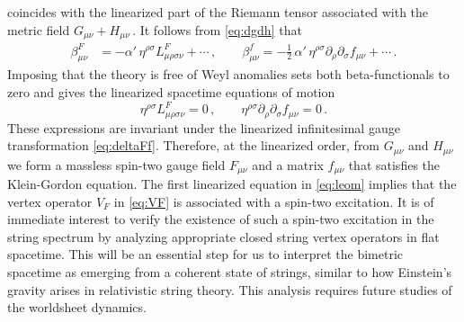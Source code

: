 \documentclass[11pt]{article}
\newcommand{\be}{\begin{equation}}
\newcommand{\ee}{\end{equation}}
\newcommand{\p}{\partial}
\begin{document}
%
coincides with the linearized part of the Riemann tensor associated with the metric field $G_{\mu\nu} + H_{\mu\nu}$\,.
It follows from \eqref{eq:dgdh} that
%
\begin{align}
	\beta^F_{\mu\nu} & = - \alpha' \, \eta^{\rho\sigma} L^F_{\mu\rho\sigma\nu} + \cdots\,, 
		\qquad%
	\beta^f_{\mu\nu} = - \frac{1}{2} \, \alpha' \, \eta^{\rho\sigma} \p_\rho \p_\sigma f_{\mu\nu} + \cdots\,.
\end{align}
%
Imposing that the theory is free of Weyl anomalies sets both beta-functionals to zero and gives the linearized spacetime equations of motion
%
\be \label{eq:leom}
	\eta^{\rho\sigma} L^F_{\mu\rho\sigma\nu} = 0\,,
		\qquad
	\eta^{\rho\sigma} \p_\rho \p_\sigma f_{\mu\nu} = 0\,.
\ee
%
These expressions are invariant under the linearized infinitesimal gauge transformation \eqref{eq:deltaFf}. Therefore, at the linearized order, from $G_{\mu\nu}$ and $H_{\mu\nu}$ we form a massless spin-two gauge field $F_{\mu\nu}$ and a matrix $f_{\mu\nu}$ that satisfies the Klein-Gordon equation. 
The first linearized equation in \eqref{eq:leom} implies that the vertex operator $V_F$ in \eqref{eq:VF} is associated with a spin-two excitation. It is of immediate interest to verify the existence of such a spin-two excitation in the string spectrum by analyzing appropriate closed string vertex operators in flat spacetime. This will be an essential step for us to interpret the bimetric spacetime as emerging from a coherent state of strings, similar to how Einstein's gravity arises in relativistic string theory. This analysis requires future studies of the worldsheet dynamics.
\end{document}
